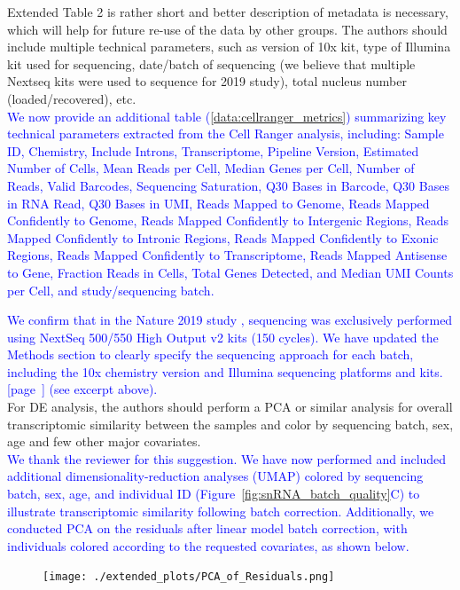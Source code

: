 \documentclass[12pt]{article}
\begin{document}
Extended Table 2 is rather short and better description of metadata is necessary, which will help for future re-use of the data by other groups. The authors should include multiple technical parameters, such as version of 10x kit, type of Illumina kit used for sequencing, date/batch of sequencing (we believe that multiple Nextseq kits were used to sequence for 2019 study), total nucleus number (loaded/recovered), etc.\\
\textcolor{blue}{We now provide an additional table (\ref{data:cellranger_metrics}) summarizing key technical parameters extracted from the Cell Ranger analysis, including: Sample ID, Chemistry, Include Introns, Transcriptome, Pipeline Version, Estimated Number of Cells, Mean Reads per Cell, Median Genes per Cell, Number of Reads, Valid Barcodes, Sequencing Saturation, Q30 Bases in Barcode, Q30 Bases in RNA Read, Q30 Bases in UMI, Reads Mapped to Genome, Reads Mapped Confidently to Genome, Reads Mapped Confidently to Intergenic Regions, Reads Mapped Confidently to Intronic Regions, Reads Mapped Confidently to Exonic Regions, Reads Mapped Confidently to Transcriptome, Reads Mapped Antisense to Gene, Fraction Reads in Cells, Total Genes Detected, and Median UMI Counts per Cell, and study/sequencing batch.}

\textcolor{blue}{We confirm that in the Nature 2019 study \cite{Mathys2019-wb}, sequencing was exclusively performed using NextSeq 500/550 High Output v2 kits (150 cycles). We have updated the Methods section to clearly specify the sequencing approach for each batch, including the 10x chemistry version and Illumina sequencing platforms and kits. [page~\pageref{quoteJ-label}] (see excerpt above).}\\

For DE analysis, the authors should perform a PCA or similar analysis for overall transcriptomic similarity between the samples and color by sequencing batch, sex, age and few other major covariates.\\
\textcolor{blue}{We thank the reviewer for this suggestion. We have now performed and included additional dimensionality-reduction analyses (UMAP) colored by sequencing batch, sex, age, and individual ID (Figure~\ref{fig:snRNA_batch_quality}C) to illustrate transcriptomic similarity following batch correction. Additionally, we conducted PCA on the residuals after linear model batch correction, with individuals colored according to the requested covariates, as shown below.}

\begin{figure}[H]
	\texttt{[image: ./extended\_plots/PCA\_of\_Residuals.png]}        
\end{figure}
\end{document}
